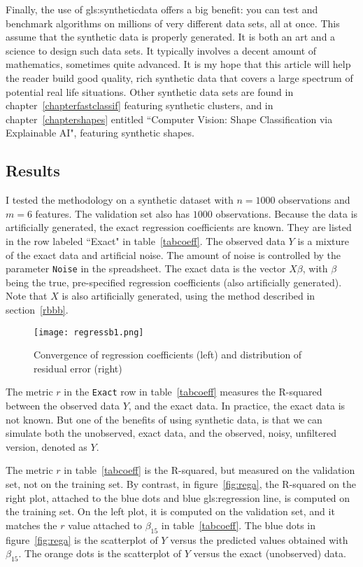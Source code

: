 \documentclass[oneside,10pt]{book}
\begin{document}
Finally, the use of \gls{gls:syntheticdata} offers a big benefit: you can test and benchmark algorithms on millions of very different data sets, all at once. This assume that the synthetic data is properly generated. It is both an art and a science to design such data sets. It typically involves a decent amount of mathematics, sometimes quite advanced. It is my hope that this article will help the reader build good quality, rich synthetic data that covers a large spectrum of potential real life situations. Other synthetic data sets are found in chapter~\ref{chapterfastclassif}
 featuring synthetic clusters, and in chapter~\ref{chaptershapes} entitled ``Computer Vision: Shape Classification via Explainable AI", featuring synthetic shapes.


\subsection{Results}\label{rres}

I tested the methodology on a synthetic dataset with $n=1000$ observations and $m=6$ features. The validation set also has $1000$ observations. Because the data is artificially generated, the exact regression coefficients are known. They are listed in the row labeled ``Exact" in table~\ref{tabcoeff}. The observed data $Y$ is a mixture of the exact data  and artificial noise. The amount of noise is controlled by the parameter \texttt{Noise} in the spreadsheet.
The exact data is the vector $X\beta$, with $\beta$ being the true, pre-specified regression coefficients (also artificially generated). Note that $X$ is also artificially generated, using the method described in section~\ref{rbbb}.


\begin{figure}%
\centering
\texttt{[image: regressb1.png]}
\caption{Convergence of regression coefficients (left) and distribution of residual error (right)}
\label{fig:regb}
\end{figure}

The metric $r$ in the \texttt{Exact} row in table~\ref{tabcoeff} measures the R-squared between the observed data $Y$, and the exact data. In practice, the exact data is not known. But one of the benefits of using synthetic data, is that we can simulate both the unobserved, exact data, and the observed, noisy, unfiltered version, denoted as $Y$.

The metric $r$ in table~\ref{tabcoeff} is the R-squared, but measured on the validation set, not on the training set. By contrast,
in figure~\ref{fig:rega}, the R-squared on the right plot, attached to the blue dots and blue \gls{gls:regression} line,  is computed on the training set. On the left plot, it is computed on the validation set, and it matches the $r$ value attached to  $\beta_{15}$ in table~\ref{tabcoeff}. The blue dots in figure~\ref{fig:rega} is the scatterplot of $Y$ versus the predicted values obtained with $\beta_{15}$. The orange dots is the scatterplot of $Y$ versus the exact (unobserved) data.
\end{document}
